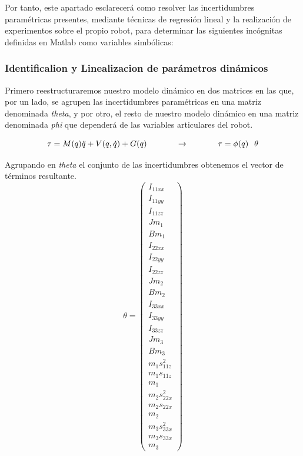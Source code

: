 Por tanto, este apartado esclarecerá como resolver las incertidumbres paramétricas presentes, mediante
técnicas de regresión lineal y la realización de experimentos sobre el propio robot, para determinar las siguientes
incógnitas definidas en Matlab como variables simbólicas:

	\subsubsection{Identificalion y Linealizacion de parámetros dinámicos}
		Primero reestructuraremos nuestro modelo dinámico en dos matrices en las que, por un lado,
		se agrupen las incertidumbres paramétricas en una matriz denominada \textit{theta}, y por otro, el resto de nuestro modelo
		dinámico en una matriz denominada \textit{phi} que dependerá de las variables articulares del robot.

		\begin{equation}
			\tau=M(q)\ddot{q}+V(q,\dot{q})+G(q) \hspace{1.25cm}  \rightarrow \hspace{1.25cm} \tau=\phi(q) \hspace{0.25cm} \theta
		\end{equation}


	Agrupando en \textit{theta} el conjunto de las incertidumbres obtenemos el vector de términos resultante.
	\begin{equation}
		\theta=
			\begin{pmatrix}
				I_{11xx} \\
				I_{11yy}\\
				I_{11zz}\\
				Jm_{1} \\
				Bm_{1} \\
				I_{22xx} \\
				I_{22yy}\\
				I_{22zz}\\
				Jm_{2} \\
				Bm_{2} \\
				I_{33xx} \\
				I_{33yy}\\
				I_{33zz}\\
				Jm_{3} \\
				Bm_{3} \\
				m_{1}s_{11z}^{2} \\
				m_{1}s_{11z} \\
				m_{1}\\
				m_{2}s_{22x}^{2} \\
				m_{2}s_{22x} \\
				m_{2}\\
				m_{3}s_{33x}^{2} \\
				m_{3}s_{33x} \\
				m_{3}
				\end{pmatrix}
		\end{equation}

